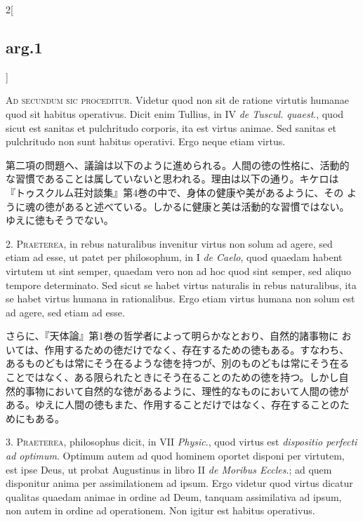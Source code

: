 \documentclass[paper=a4paper,fontsize=10pt,jafontsize=9pt,titlepage]{jlreq}
\begin{document}
\begin{paracol}{2}[\subsection{arg.1}]

{\scshape Ad secundum sic proceditur}. Videtur quod non sit de ratione
virtutis humanae quod sit habitus operativus. Dicit enim Tullius, in
IV {\itshape de Tuscul. quaest}., quod sicut est sanitas et
pulchritudo corporis, ita est virtus animae. Sed sanitas et
pulchritudo non sunt habitus operativi. Ergo neque etiam virtus.

\switchcolumn

第二項の問題へ、議論は以下のように進められる。人間の徳の性格に、活動的
な習慣であることは属していないと思われる。理由は以下の通り。キケロは
『トゥスクルム荘対談集』第4巻の中で、身体の健康や美があるように、その
ように魂の徳があると述べている。しかるに健康と美は活動的な習慣ではない。
ゆえに徳もそうでない。


2. {\scshape Praeterea}, in rebus naturalibus invenitur virtus non
solum ad agere, sed etiam ad esse, ut patet per philosophum, in I
{\itshape de Caelo}, quod quaedam habent virtutem ut sint semper,
quaedam vero non ad hoc quod sint semper, sed aliquo tempore
determinato. Sed sicut se habet virtus naturalis in rebus naturalibus,
ita se habet virtus humana in rationalibus. Ergo etiam virtus humana
non solum est ad agere, sed etiam ad esse.

\switchcolumn

さらに、『天体論』第1巻の哲学者によって明らかなとおり、自然的諸事物に
おいては、作用するための徳だけでなく、存在するための徳もある。すなわち、
あるものどもは常にそう在るような徳を持つが、別のものどもは常にそう在る
ことではなく、ある限られたときにそう在ることのための徳を持つ。しかし自
然的事物において自然的な徳があるように、理性的なものにおいて人間の徳が
ある。ゆえに人間の徳もまた、作用することだけではなく、存在することのた
めにもある。


3. {\scshape Praeterea}, philosophus dicit, in VII {\itshape Physic}.,
quod virtus est {\itshape dispositio perfecti ad optimum}. Optimum
autem ad quod hominem oportet disponi per virtutem, est ipse Deus, ut
probat Augustinus in libro II {\itshape de Moribus Eccles}.; ad quem
disponitur anima per assimilationem ad ipsum. Ergo videtur quod virtus
dicatur qualitas quaedam animae in ordine ad Deum, tanquam
assimilativa ad ipsum, non autem in ordine ad operationem. Non igitur
est habitus operativus.


\end{paracol}
\end{document}
